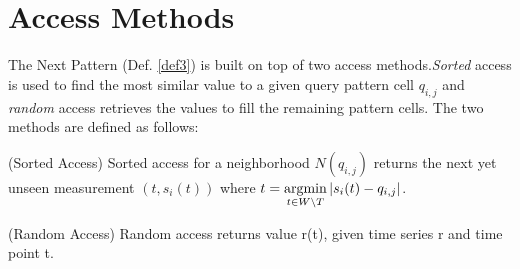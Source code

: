 \documentclass[abstracton,12pt,oneside]{scrreprt}
\begin{document}
\section{Access Methods}
\label{AccessMethods}
The Next Pattern (Def. \ref{def3})  is built on top of two access methods.\emph{Sorted} access is used to find the most similar value to a given query pattern cell $q_{i,j}$ and \emph{random} access retrieves the values to fill the remaining pattern cells. The two methods are defined as follows: 
\begin{defn}
	\label{sorted}
	(Sorted Access) Sorted access for a neighborhood $N(q_{i,j})$ returns the next yet unseen measurement $(t, s_i(t))$ where $t = \argmin_{t \in W \setminus T} |s_i(t) - q_{i,j}|$.
\end{defn}
\begin{defn}
	\label{random}
	(Random Access) Random access returns value r(t), given time series r and time point t.	
\end{defn}
\end{document}
